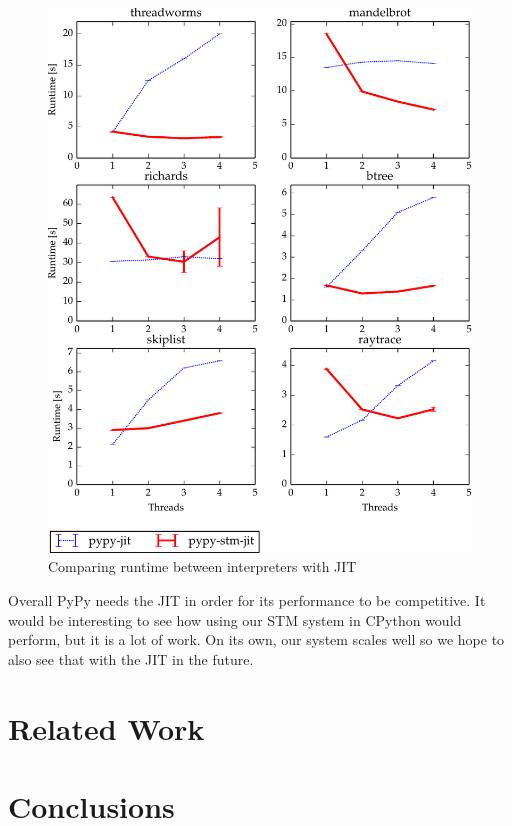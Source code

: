 \documentclass{sigplanconf}
\begin{document}
\begin{figure}[h]
  \centering
  \includegraphics[width=1\columnwidth]{plots/performance.pdf}
  \caption{Comparing runtime between interpreters with JIT\label{fig:performance-jit}}
\end{figure}


Overall PyPy needs the JIT in order for its performance to be
competitive.  It would be interesting to see how using our STM system
in CPython would perform, but it is a lot of work. On its own, our
system scales well so we hope to also see that with the JIT in the
future.


\section{Related Work}


\section{Conclusions}
\end{document}
